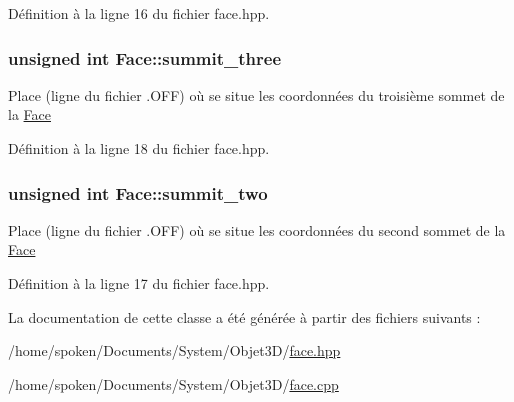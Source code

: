 Définition à la ligne 16 du fichier face.\-hpp.

\hypertarget{class_face_af322077aea999dd19dd169bd5bdd4bdf}{
\subsubsection[{summit\-\_\-three}]{\setlength{\rightskip}{0pt plus 5cm}unsigned int Face\-::summit\-\_\-three\hspace{0.3cm}{\ttfamily [private]}}}\label{class_face_af322077aea999dd19dd169bd5bdd4bdf}
Place (ligne du fichier .O\-F\-F) où se situe les coordonnées du troisième sommet de la \hyperlink{class_face}{Face} 

Définition à la ligne 18 du fichier face.\-hpp.

\hypertarget{class_face_a8d0b2a96bd53dcf7767c2cefe1fcc1f3}{
\subsubsection[{summit\-\_\-two}]{\setlength{\rightskip}{0pt plus 5cm}unsigned int Face\-::summit\-\_\-two\hspace{0.3cm}{\ttfamily [private]}}}\label{class_face_a8d0b2a96bd53dcf7767c2cefe1fcc1f3}
Place (ligne du fichier .O\-F\-F) où se situe les coordonnées du second sommet de la \hyperlink{class_face}{Face} 

Définition à la ligne 17 du fichier face.\-hpp.



La documentation de cette classe a été générée à partir des fichiers suivants \-:\begin{DoxyCompactItemize}
\item 
/home/spoken/\-Documents/\-System/\-Objet3\-D/\hyperlink{face_8hpp}{face.\-hpp}\item 
/home/spoken/\-Documents/\-System/\-Objet3\-D/\hyperlink{face_8cpp}{face.\-cpp}\end{DoxyCompactItemize}
